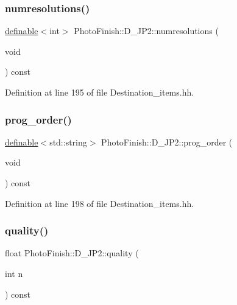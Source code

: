 \subsubsection{\texorpdfstring{numresolutions()}{numresolutions()}}
{\footnotesize\ttfamily \hyperlink{class_photo_finish_1_1definable}{definable}$<$int$>$ Photo\+Finish\+::\+D\+\_\+\+J\+P2\+::numresolutions (\begin{DoxyParamCaption}\item[{void}]{ }\end{DoxyParamCaption}) const\hspace{0.3cm}{\ttfamily [inline]}}



Definition at line 195 of file Destination\+\_\+items.\+hh.

\mbox{\label{class_photo_finish_1_1_d___j_p2_a4d7e7f3bb77d745b8137d30bb21f2f89}} 
\subsubsection{\texorpdfstring{prog\+\_\+order()}{prog\_order()}}
{\footnotesize\ttfamily \hyperlink{class_photo_finish_1_1definable}{definable}$<$std\+::string$>$ Photo\+Finish\+::\+D\+\_\+\+J\+P2\+::prog\+\_\+order (\begin{DoxyParamCaption}\item[{void}]{ }\end{DoxyParamCaption}) const\hspace{0.3cm}{\ttfamily [inline]}}



Definition at line 198 of file Destination\+\_\+items.\+hh.

\mbox{\label{class_photo_finish_1_1_d___j_p2_acd4d08495e26490954c19f0692713791}} 
\subsubsection{\texorpdfstring{quality()}{quality()}}
{\footnotesize\ttfamily float Photo\+Finish\+::\+D\+\_\+\+J\+P2\+::quality (\begin{DoxyParamCaption}\item[{int}]{n }\end{DoxyParamCaption}) const\hspace{0.3cm}{\ttfamily [inline]}}



